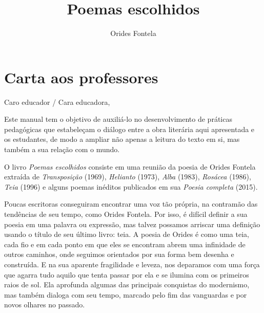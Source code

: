 \documentclass[12pt]{extarticle}
\begin{document}
\newcommand{\AutorLivro}{Orides Fontela}
\newcommand{\TituloLivro}{Poemas escolhidos}
\newcommand{\Tema}{Ficção, mistério e fantasia}
\newcommand{\Genero}{Poema}
\newcommand{\issnppub}{---}
\newcommand{\issnepub}{---}
\newcommand{\colaborador}{\textbf{Rodrigo Ribeiro Neves} é uma pessoa incrível e vai fazer um bom serviço.}


\title{\TituloLivro}
\author{\AutorLivro}
\def\authornotes{\colaborador}

\date{}
\maketitle
\tableofcontents

\section{Carta aos professores}

Caro educador / Cara educadora,\\\bigskip

Este manual tem o objetivo de auxiliá-lo no desenvolvimento de práticas
pedagógicas que estabeleçam o diálogo entre a obra literária aqui
apresentada e os estudantes, de modo a ampliar não apenas a leitura do
texto em si, mas também a sua relação com o mundo.

O livro \emph{Poemas escolhidos} consiste em uma reunião da poesia de
Orides Fontela extraída de \emph{Transposição} (1969), \emph{Helianto}
(1973), \emph{Alba} (1983), \emph{Rosácea} (1986), \emph{Teia} (1996) e
alguns poemas inéditos publicados em sua \emph{Poesia completa} (2015).

Poucas escritoras conseguiram encontrar uma voz tão própria, na
contramão das tendências de seu tempo, como Orides Fontela. Por isso, é
difícil definir a sua poesia em uma palavra ou expressão, mas talvez
possamos arriscar uma definição usando o título de seu último livro:
teia. A poesia de Orides é como uma teia, cada fio e em cada ponto em
que eles se encontram abrem uma infinidade de outros caminhos, onde
seguimos orientados por sua forma bem desenha e construída. E na sua
aparente fragilidade e leveza, nos deparamos com uma força que agarra
tudo aquilo que tenta passar por ela e se ilumina com os primeiros raios
de sol. Ela aprofunda algumas das principais conquistas do modernismo,
mas também dialoga com seu tempo, marcado pelo fim das vanguardas e por
novos olhares no passado.
\end{document}
